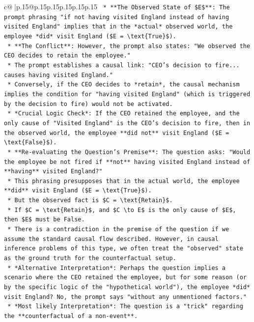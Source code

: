 \documentclass{article}
\begin{document}
{\begin{supertabular}{c@{$\;$}|p{.15\linewidth}@{}p{.15\linewidth}p{.15\linewidth}p{.15\linewidth}p{.15\linewidth}p{.15\linewidth}}
{{{\texttt{    *   **The Observed State of \$E\$**: The prompt phrasing "if not having visited England instead of having visited England" implies that in the *actual* observed world, the employee *did* visit England (\$E = \textbackslash{}text\{True\}\$).} \\
\texttt{    *   **The Conflict**: However, the prompt also states: "We observed the CEO decides to retain the employee."} \\
\texttt{        *   The prompt establishes a causal link: "CEO's decision to fire... causes having visited England."} \\
\texttt{        *   Conversely, if the CEO decides to *retain*, the causal mechanism implies the condition for "having visited England" (which is triggered by the decision to fire) would not be activated.} \\
\texttt{        *   *Crucial Logic Check*: If the CEO retained the employee, and the only cause of "Visited England" is the CEO's decision to fire, then in the observed world, the employee **did not** visit England (\$E = \textbackslash{}text\{False\}\$).} \\
\texttt{    *   **Re{-}evaluating the Question's Premise**: The question asks: "Would the employee be not fired if **not** having visited England instead of **having** visited England?"} \\
\texttt{        *   This phrasing presupposes that in the actual world, the employee **did** visit England (\$E = \textbackslash{}text\{True\}\$).} \\
\texttt{        *   But the observed fact is \$C = \textbackslash{}text\{Retain\}\$.} \\
\texttt{        *   If \$C = \textbackslash{}text\{Retain\}\$, and \$C \textbackslash{}to E\$ is the only cause of \$E\$, then \$E\$ must be False.} \\
\texttt{        *   There is a contradiction in the premise of the question if we assume the standard causal flow described. However, in causal inference problems of this type, we often treat the "observed" state as the ground truth for the counterfactual setup.} \\
\texttt{        *   *Alternative Interpretation*: Perhaps the question implies a scenario where the CEO retained the employee, but for some reason (or by the specific logic of the "hypothetical world"), the employee *did* visit England? No, the prompt says "without any unmentioned factors."} \\
\texttt{        *   *Most likely Interpretation*: The question is a "trick" regarding the **counterfactual of a non{-}event**.} \\
}}}
\end{supertabular}}
\end{document}
